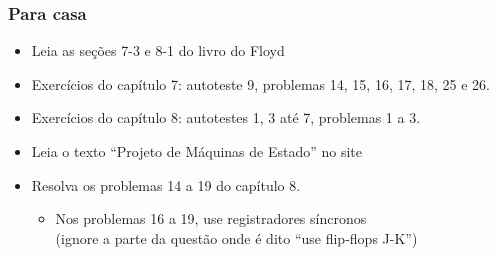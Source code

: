 \documentclass{beamer}
\begin{document}
\begin{frame}
\frametitle{Para casa}

\begin{itemize}
\item Leia as seções 7-3 e 8-1 do livro do Floyd
\item Exercícios do capítulo 7: autoteste 9, problemas 14, 15, 16, 17, 18, 25 e 26.
\item Exercícios do capítulo 8: autotestes 1, 3 até 7, problemas 1 a 3.
\item Leia o texto ``Projeto de Máquinas de Estado'' no site
\item Resolva os problemas 14 a 19 do capítulo 8.
\begin{itemize}
\item Nos problemas 16 a 19, use registradores síncronos\\
(ignore a parte da questão onde é dito ``use flip-flops J-K'')
\end{itemize}
\end{itemize}

\end{frame}
\end{document}
